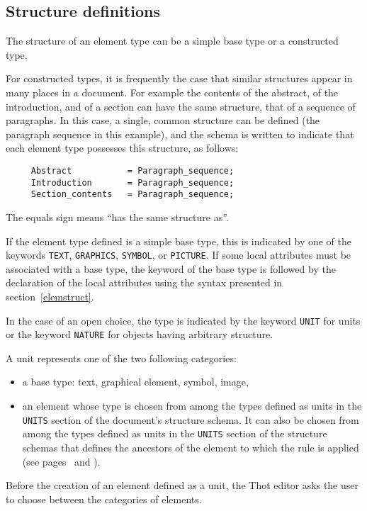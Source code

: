 \subsection{Structure definitions}
\label{defstruct}

The structure of an element type can be a simple base type or a
constructed type.

For constructed types, it is frequently the case that similar
structures appear in many places in a document.  For example the
contents of the abstract, of the introduction, and of a section can
have the same structure, that of a sequence of paragraphs.  In this
case, a single, common structure can be defined (the paragraph
sequence in this example), and the schema is written to indicate that
each element type possesses this structure, as follows:
\begin{verbatim}
     Abstract           = Paragraph_sequence;
     Introduction       = Paragraph_sequence;
     Section_contents   = Paragraph_sequence;
\end{verbatim}
The equals sign means ``has the same structure as''.

If the element type defined is a simple base type, this is indicated
by one of the keywords {\tt TEXT}, {\tt GRAPHICS}, {\tt SYMBOL}, or
{\tt PICTURE}.  If some local attributes must be associated with a base
type, the keyword of the base type is followed by the declaration of
the local attributes using the syntax presented in
section~\ref{elemstruct}.

In the case of an open choice, the type is indicated by the
keyword {\tt UNIT} for units or the keyword {\tt NATURE} for objects
having arbitrary structure.

A unit represents one of the two following categories:
\begin{itemize}
  \item a base type: text, graphical element, symbol, image,

  \item an element whose type is chosen from among the types defined
as units in the {\tt UNITS} section of the document's structure schema.
It can also be chosen from among the types defined as units in the
{\tt UNITS} section of the structure schemas that defines the
ancestors of the element to which the rule is applied (see pages~\pageref{schemasandunits} and \pageref{uniteslog}).
\end{itemize}

Before the creation of an element defined as a unit, the Thot editor
asks the user to choose between the categories of elements.

